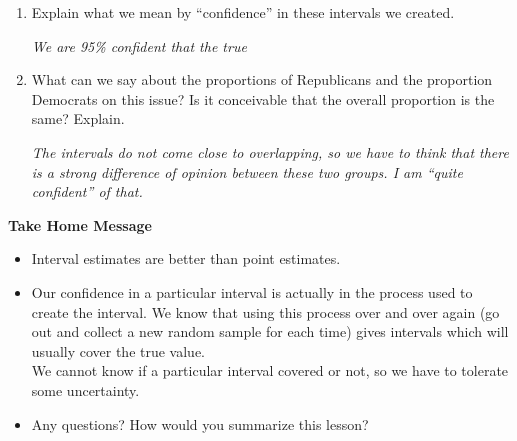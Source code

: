 \begin{enumerate}
\begin{enumerate}
\begin{enumerate}
\begin{key}
  {\em (0.701, 0.758), again very close. }
\end{key}
      \end{enumerate}
    \item Explain what we mean by ``confidence'' in these intervals we
      created.
\begin{students}
\vspace{3.8cm}
\end{students}

\begin{key}
  {\em We are 95\% confident that the true }
\end{key}

\item What can we say about the proportions of Republicans and the
  proportion Democrats on this issue? Is it conceivable that the
  overall proportion is the same?  Explain.

\begin{students}
\vspace{2cm}
\end{students}

\begin{key}
  {\em The intervals do not come close to overlapping, so we have to
    think that there is a strong difference of opinion between these
    two groups. I am ``quite confident'' of that.}
\end{key}
    \end{enumerate}
  
  \end{enumerate}


\begin{center}
  {\large \bf Take Home Message} 
\end{center}

\begin{itemize}
\item Interval estimates are better than point estimates.
\item Our confidence in a particular interval is actually in the
  process used to create the interval.  We know that using this
  process over and over again (go out and collect a new random sample
  for each time) gives intervals which will usually
  cover the true value.\\
   We cannot know if a particular interval covered or not, so we have
   to  tolerate some uncertainty.
 \item 
  Any questions? How would you  summarize this  lesson?
\end{itemize}





